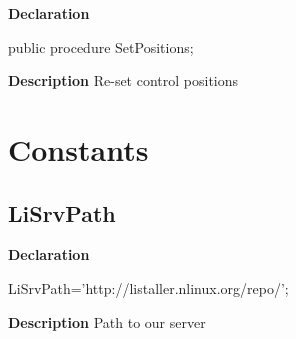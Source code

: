 \documentclass{report}
\newif\ifpdf
\begin{document}
\label{swcatalog.TCTLEntry-SetPositions}
\begin{list}{}{
\setlength{\itemindent}{0cm}
\setlength{\listparindent}{0cm}
\setlength{\leftmargin}{\evensidemargin}
\addtolength{\leftmargin}{\tmplength}
\settowidth{\labelsep}{X}
\addtolength{\leftmargin}{\labelsep}
\setlength{\labelwidth}{\tmplength}
}
\item[\textbf{Declaration}\hfill]
\ifpdf
\begin{flushleft}
\fi
\begin{ttfamily}
public procedure SetPositions;\end{ttfamily}

\ifpdf
\end{flushleft}
\fi

\par
\item[\textbf{Description}]
Re{-}set control positions

\end{list}
\section{Constants}
\ifpdf
\subsection*{\large{\textbf{LiSrvPath}}\normalsize\hspace{1ex}\hrulefill}
\else
\subsection*{LiSrvPath}
\fi
\label{swcatalog-LiSrvPath}
\begin{list}{}{
\setlength{\itemindent}{0cm}
\setlength{\listparindent}{0cm}
\setlength{\leftmargin}{\evensidemargin}
\addtolength{\leftmargin}{\tmplength}
\settowidth{\labelsep}{X}
\addtolength{\leftmargin}{\labelsep}
\setlength{\labelwidth}{\tmplength}
}
\item[\textbf{Declaration}\hfill]
\ifpdf
\begin{flushleft}
\fi
\begin{ttfamily}
LiSrvPath='http://listaller.nlinux.org/repo/';\end{ttfamily}

\ifpdf
\end{flushleft}
\fi

\par
\item[\textbf{Description}]
Path to our server

\end{list}
\end{document}
